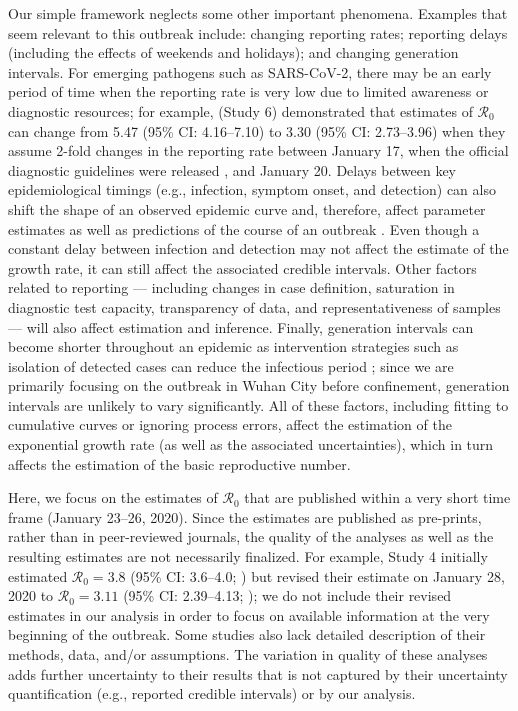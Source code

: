 \documentclass[12pt]{article}
\newcommand{\Ro}{\ensuremath{{\mathcal R}_{0}}\xspace}
\begin{document}
Our simple framework neglects some other important phenomena.
Examples that seem relevant to this outbreak include: changing reporting rates; reporting delays (including the effects of weekends and holidays); and changing generation intervals.
For emerging pathogens such as SARS-CoV-2, there may be an early period of time when the reporting rate is very low due to limited awareness or diagnostic resources;
for example, \cite{zhaoncov} (Study 6) demonstrated that estimates of \Ro can change from 5.47 (95\% CI: 4.16--7.10) to 3.30 (95\% CI: 2.73--3.96) when they assume 2-fold changes in the reporting rate between January 17, when the official diagnostic guidelines were released \citep{who17protocol}, and January 20.
Delays between key epidemiological timings (e.g., infection, symptom onset, and detection) can also shift the shape of an observed epidemic curve and, therefore, affect parameter estimates as well as predictions of the course of an outbreak \citep{tariq2019assessing}.
Even though a constant delay between infection and detection may not affect the estimate of the growth rate, it can still affect the associated credible intervals.
Other factors related to reporting --- including changes in case definition, saturation in diagnostic test capacity, transparency of data, and representativeness of samples --- will also affect estimation and inference.
Finally, generation intervals can become shorter throughout an epidemic as intervention strategies such as isolation of detected cases can reduce the infectious period \citep{hethcote2002effects};
since we are primarily focusing on the outbreak in Wuhan City before confinement, generation intervals are unlikely to vary significantly.
All of these factors, including fitting to cumulative curves or ignoring process errors, affect the estimation of the exponential growth rate (as well as the associated uncertainties), which in turn affects the estimation of the basic reproductive number.

Here, we focus on the estimates of \Ro that are published within a very short time frame (January 23--26, 2020).
Since the estimates are published as pre-prints, rather than in peer-reviewed journals, the quality of the analyses as well as the resulting estimates are not necessarily finalized.
For example, Study 4 initially estimated $\Ro = 3.8$ (95\% CI: 3.6--4.0; \cite{readncov}) but revised their estimate on January 28, 2020 to $\Ro = 3.11$ (95\% CI: 2.39--4.13; \cite{readncov2});
we do not include their revised estimates in our analysis in order to focus on available information at the very beginning of the outbreak.
Some studies also lack detailed description of their methods, data, and/or assumptions.
The variation in quality of these analyses adds further uncertainty to their results that is not captured by their uncertainty quantification (e.g., reported credible intervals) or by our analysis.
\end{document}
